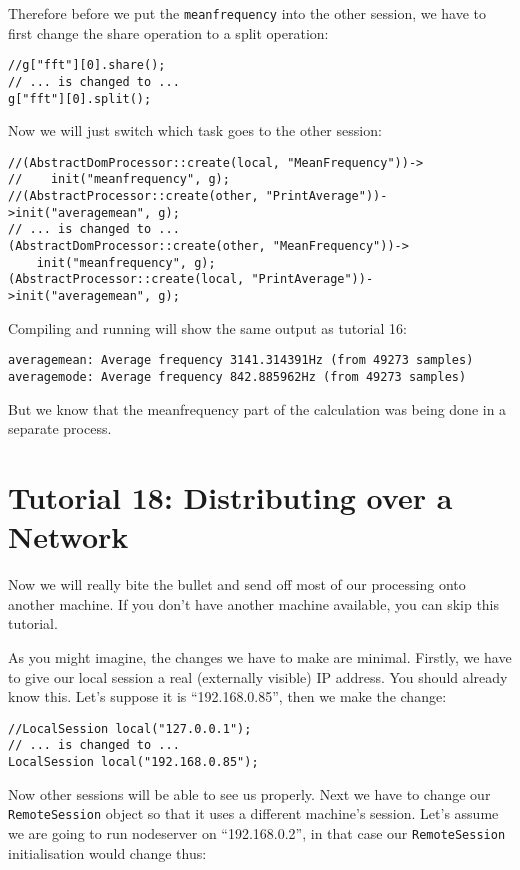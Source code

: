 Therefore before we put the \texttt{meanfrequency} into the other session, we have to first change the share operation to a split operation:

\begin{verbatim}
//g["fft"][0].share();
// ... is changed to ...
g["fft"][0].split();
\end{verbatim} 

Now we will just switch which task goes to the other session:

\begin{verbatim}
//(AbstractDomProcessor::create(local, "MeanFrequency"))->
//    init("meanfrequency", g);
//(AbstractProcessor::create(other, "PrintAverage"))->init("averagemean", g);
// ... is changed to ...
(AbstractDomProcessor::create(other, "MeanFrequency"))->
    init("meanfrequency", g);
(AbstractProcessor::create(local, "PrintAverage"))->init("averagemean", g);
\end{verbatim}

Compiling and running will show the same output as tutorial 16:

\begin{verbatim}
averagemean: Average frequency 3141.314391Hz (from 49273 samples)
averagemode: Average frequency 842.885962Hz (from 49273 samples)
\end{verbatim}

But we know that the meanfrequency part of the calculation was being done in a separate process.




\section{Tutorial 18: Distributing over a Network}

Now we will really bite the bullet and send off most of our processing onto another machine. If you don't have another machine available, you can skip this tutorial.

As you might imagine, the changes we have to make are minimal. Firstly, we have to give our local session a real (externally visible) IP address. You should already know this. Let's suppose it is ``192.168.0.85'', then we make the change:

\begin{verbatim}
//LocalSession local("127.0.0.1");
// ... is changed to ...
LocalSession local("192.168.0.85");
\end{verbatim}

Now other sessions will be able to see us properly. Next we have to change our \texttt{RemoteSession} object so that it uses a different machine's session. Let's assume we are going to run nodeserver on ``192.168.0.2'', in that case our \texttt{RemoteSession} initialisation would change thus:

